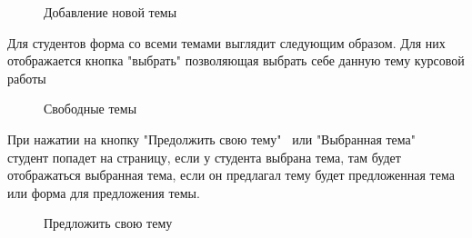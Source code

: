 \documentclass[14pt]{extarticle} %
\begin{document}
\begin{figure}[h]
	\centering	{}
	\caption{Добавление новой темы}
	\label{ris1}
\end{figure}

Для студентов форма со всеми темами выглядит следующим образом. Для них отображается кнопка "выбрать" позволяющая выбрать себе данную тему курсовой работы

\begin{figure}[h]
	\centering	{}
	\caption{Свободные темы}
	\label{ris1}
\end{figure}
\newpage
При нажатии на кнопку "Предолжить свою тему" \, или "Выбранная тема" \, студент попадет на страницу, если у студента выбрана тема, там будет отображаться выбранная тема, если он предлагал тему будет предложенная тема или форма для предложения темы.

\begin{figure}[h]
	\centering	{}
	\caption{Предложить свою тему}
	\label{ris1}
\end{figure}
\end{document}
